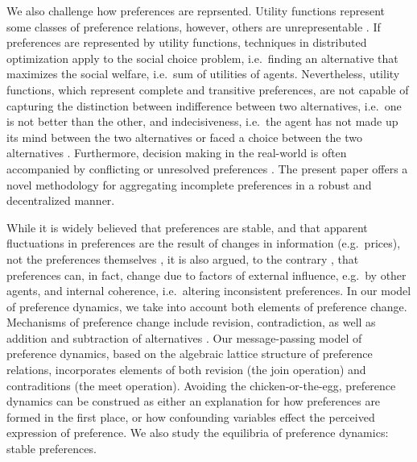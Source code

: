 \documentclass[conference]{ieeeconf}
\begin{document}
We also challenge how preferences are reprsented. Utility functions represent some classes of preference relations, however, others are unrepresentable \cite{Beardon2002}. If preferences are represented by utility functions, techniques in distributed optimization apply to the social choice problem, i.e.~finding an alternative that maximizes the social welfare, i.e.~sum of utilities of agents. Nevertheless, utility functions, which represent complete and transitive preferences, are not capable of capturing the distinction between indifference between two alternatives, i.e.~one is not better than the other, and indecisiveness, i.e.~the agent has not made up its mind between the two alternatives or faced a choice between the two alternatives \cite{eliaz2006}. Furthermore, decision making in the real-world is often accompanied by conflicting or unresolved preferences \cite{levi1990}. The present paper offers a novel methodology for aggregating incomplete preferences in a robust and decentralized manner.

While it is widely believed that preferences are stable, and that apparent fluctuations in preferences are the result of changes in information (e.g.~prices), not the preferences themselves \cite{stigler1977}, it is also argued, to the contrary \cite{hansen1995}, that preferences can, in fact, change due to factors of external influence, e.g.~by other agents, and internal coherence, i.e.~altering inconsistent preferences. In our model of preference dynamics, we take into account both elements of preference change. Mechanisms of preference change include revision, contradiction, as well as addition and subtraction of alternatives \cite{hansen1995}. Our message-passing model of preference dynamics, based on the algebraic lattice structure of preference relations, incorporates elements of both revision (the join operation) and contraditions (the meet operation). Avoiding the chicken-or-the-egg, preference dynamics can be construed as either an explanation for how preferences are formed in the first place, or how confounding variables effect the perceived expression of preference. We also study the equilibria of preference dynamics: stable preferences.
\end{document}
